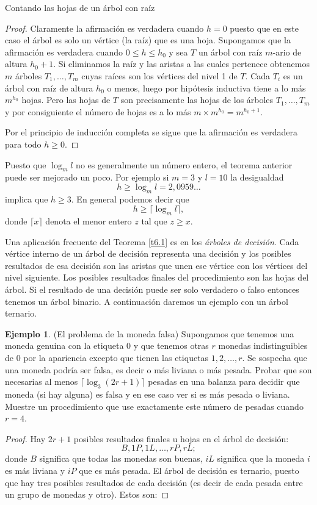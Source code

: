 \documentclass[11pt,spanish,makeidx]{amsbook}
\theoremstyle{definition}
\newtheorem{ejemplo}{Ejemplo}[section]
\theoremstyle{remark}
\begin{document}
\begin{section}{Contando las hojas de un árbol con raíz}
\begin{proof}
Claramente la afirmación es verdadera cuando $h=0$ puesto que en este caso el árbol es solo un vértice (la raíz) que es una hoja. Supongamos que la afirmación es verdadera cuando $0\le h \le h_0$ y sea $T$ un árbol con raíz $m$-ario de altura $h_0+1$. Si eliminamos la raíz y las aristas a las cuales pertenece obtenemos $m$ árboles $T_1,\ldots,T_m$ cuyas raíces son los vértices del nivel 1 de $T$. Cada $T_i$ es un árbol con raíz de altura $h_0$ o menos, luego por hipótesis inductiva tiene a lo más $m^{h_0}$ hojas. Pero las hojas de $T$ son precisamente las hojas de los árboles $T_1,\ldots,T_m$ y por consiguiente el número de hojas es a lo más $m \times m^{h_0}= m^{h_0+1}$.

Por el principio de inducción completa se sigue que la afirmación es verdadera para todo $h\ge 0$.
\end{proof}

Puesto que $\log_ml$ no es generalmente un número entero, el teorema anterior puede ser mejorado un poco. Por ejemplo si $m=3$
y $l=10$ la desigualdad
$$
h \ge \log_ml=2,0959\ldots
$$
implica que $h\ge 3$. En general podemos decir que
$$
h\ge\lceil \log_ml\rceil,
$$
donde $\lceil x \rceil$ denota el menor entero $z$ tal que $z\ge
x$.

Una aplicación frecuente del Teorema \ref{t6.1} es en los   {\it árboles de decisión}. Cada vértice interno de un árbol de decisión representa una decisión y los posibles resultados de esa decisión son las aristas que unen ese vértice con los vértices del nivel siguiente. Los posibles resultados finales del procedimiento son las hojas del árbol. Si el resultado de una decisión puede ser solo verdadero o falso entonces tenemos un árbol binario. A continuación daremos un ejemplo con un árbol ternario.

\begin{ejemplo} \label{monedafalsa}(El problema de la moneda falsa) Supongamos que tenemos una moneda genuina con la etiqueta 0 y que tenemos otras $r$ monedas indistinguibles de 0 por la apariencia excepto que tienen las etiquetas $1,2,\ldots,r$. Se sospecha que una moneda podría ser falsa, es decir o más liviana o más pesada. Probar que son necesarias al menos $\lceil \log_3(2r+1)\rceil $ pesadas en una balanza para decidir que moneda (si hay alguna) es falsa y en ese caso ver si es más pesada o liviana. Muestre un procedimiento que use exactamente este número de pesadas cuando $r=4$.
\end{ejemplo}
\begin{proof} Hay $2r+1$ posibles resultados finales u hojas en el árbol de decisión:
$$
B,1P,1L,\ldots,rP,rL;
$$
donde $B$ significa que todas las monedas son buenas, $iL$ significa que la moneda $i$ es más liviana y $iP$ que es más pesada. El árbol de decisión es ternario, puesto que hay tres posibles resultados de cada decisión (es decir de cada pesada entre un grupo de monedas y otro). Estos son:


\end{proof}
\end{section}
\end{document}
